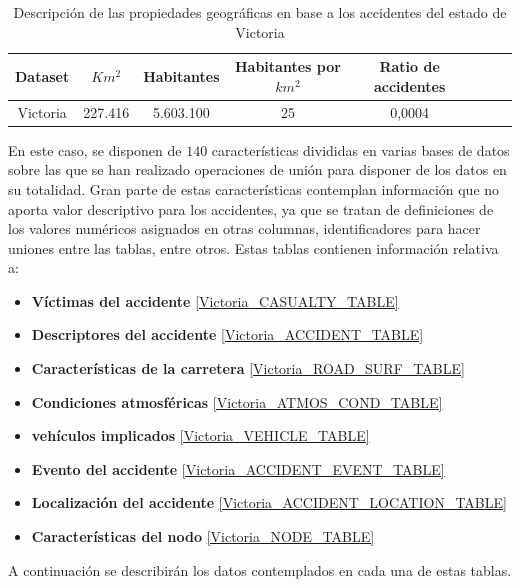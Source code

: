 \begin{table}[H]
	\begin{center}
		\begin{tabular}{|c|c||c|c|c|c|c|c|}
			\hline
			\textbf{Dataset} & \textbf{$Km^2$} & \textbf{Habitantes} & \textbf{Habitantes por $km^2$} & \textbf{Ratio de accidentes}
			\\ \hline \hline
			Victoria & 227.416 &  5.603.100  & 25  & 0,0004\\ \hline
		\end{tabular}
	\end{center}
	\caption{Descripción de las propiedades geográficas en base a los accidentes del estado de Victoria}
	\label{Victoria_statistics}
\end{table}


En este caso, se disponen de $140$ características divididas en varias bases de datos sobre las que se han realizado operaciones de unión para disponer de los datos en su totalidad. Gran parte de estas características contemplan información que no aporta valor descriptivo para los accidentes, ya que se tratan de definiciones de los valores numéricos asignados en otras columnas, identificadores para hacer uniones entre las tablas, entre otros. Estas tablas contienen información relativa a:

\begin{itemize}
	\item \textbf{Víctimas del accidente} \ref{Victoria_CASUALTY_TABLE}
	\item \textbf{Descriptores del accidente} \ref{Victoria_ACCIDENT_TABLE}
	\item \textbf{Características de la carretera} \ref{Victoria_ROAD_SURF_TABLE}
	\item \textbf{Condiciones atmosféricas} \ref{Victoria_ATMOS_COND_TABLE}
	\item \textbf{vehículos implicados} \ref{Victoria_VEHICLE_TABLE}
	\item \textbf{Evento del accidente} \ref{Victoria_ACCIDENT_EVENT_TABLE}
	\item \textbf{Localización del accidente} \ref{Victoria_ACCIDENT_LOCATION_TABLE}
	\item \textbf{Características del nodo} \ref{Victoria_NODE_TABLE}
\end{itemize}

A continuación se describirán los datos contemplados en cada una de estas tablas.

